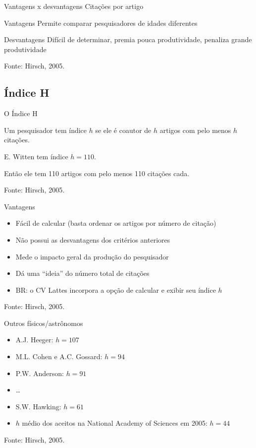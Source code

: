\documentclass{beamer}
\begin{document}
\begin{frame}{Vantagens x desvantagens}
Citações por artigo
  \begin{block}{Vantagens}
    Permite comparar pesquisadores de idades diferentes
  \end{block}
  \begin{block}{Desvantagens}
    Difícil de determinar, premia pouca produtividade, penaliza grande produtividade
  \end{block}

\vfill
Fonte: Hirsch, 2005.
\end{frame}

\subsection{Índice H}

\begin{frame}{O Índice H}
  \begin{definition}
    Um pesquisador tem índice $h$ se ele é coautor de $h$ artigos com \alert{pelo menos} $h$ citações.
  \end{definition}
  \begin{example}
    E. Witten tem índice $h=110$.

    Então ele tem 110 artigos com pelo menos 110 citações cada.

  \end{example}

\vfill
Fonte: Hirsch, 2005.
\end{frame}

\begin{frame}{Vantagens}
  \begin{itemize}
  \item Fácil de calcular (basta ordenar os artigos por número de citação)
  \item Não possui as desvantagens dos critérios anteriores
  \item Mede o impacto geral da produção do pesquisador
  \item Dá uma ``ideia'' do número total de citações
  \item BR: o CV Lattes incorpora a opção de calcular e exibir seu índice $h$
  \end{itemize}

\vfill
Fonte: Hirsch, 2005.
\end{frame}

\begin{frame}{Outros físicos/astrônomos}
  \begin{itemize}
  \item<1-> A.J. Heeger: $h=107$
  \item<1-> M.L. Cohen e A.C. Gossard: $h=94$
  \item<1-> P.W. Anderson: $h=91$
  \item<1-> \ldots
  \item<1-> S.W. Hawking: $h=61$
  \item<2-> $h$ médio dos aceitos na National Academy of Sciences em 2005: $h=44$
  \end{itemize}

\vfill
Fonte: Hirsch, 2005.
\end{frame}
\end{document}
